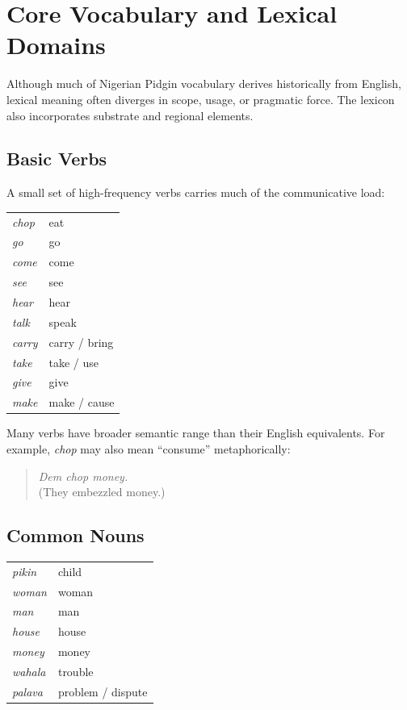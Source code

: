 \documentclass[12pt]{article}
\begin{document}
\section{Core Vocabulary and Lexical Domains}

Although much of Nigerian Pidgin vocabulary derives historically from English, lexical meaning often diverges in scope, usage, or pragmatic force. The lexicon also incorporates substrate and regional elements.

\subsection{Basic Verbs}

A small set of high-frequency verbs carries much of the communicative load:

\begin{center}
\begin{tabular}{ll}
\textit{chop} & eat \\
\textit{go} & go \\
\textit{come} & come \\
\textit{see} & see \\
\textit{hear} & hear \\
\textit{talk} & speak \\
\textit{carry} & carry / bring \\
\textit{take} & take / use \\
\textit{give} & give \\
\textit{make} & make / cause \\
\end{tabular}
\end{center}

Many verbs have broader semantic range than their English equivalents. For example, \textit{chop} may also mean ``consume'' metaphorically:

\begin{quote}
\textit{Dem chop money.} \\
(They embezzled money.)
\end{quote}

\subsection{Common Nouns}

\begin{center}
\begin{tabular}{ll}
\textit{pikin} & child \\
\textit{woman} & woman \\
\textit{man} & man \\
\textit{house} & house \\
\textit{money} & money \\
\textit{wahala} & trouble \\
\textit{palava} & problem / dispute \\
\end{tabular}
\end{center}
\end{document}
